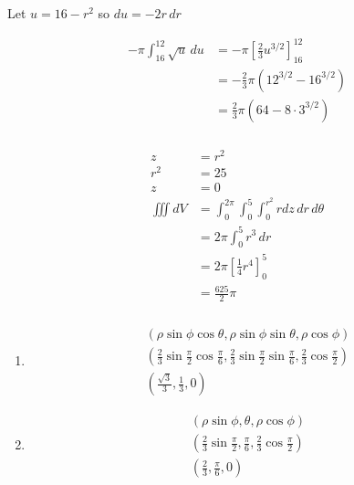 \documentclass{article}
\begin{document}
Let $u = 16 - r^2$ so $d u = -2 r \,dr$

\begin{align*}
  -\pi \int_{16}^{12} \sqrt{u} \,du & = -\pi \left[ \frac{2}{3} u^{3 / 2} \right]_{16}^{12} \\
                                    & = -\frac{2}{3} \pi (12^{3 / 2} - 16^{3 / 2})          \\
                                    & = \frac{2}{3} \pi (64 - 8 \cdot 3^{3 / 2})
\end{align*}

\setcounter{subsubsection}{52}
\subsubsection{}

\begin{align*}
  z         & = r^2                                                      \\
  r^2       & = 25                                                       \\
  z         & = 0                                                        \\
  \iiint dV & = \int_0^{2 \pi} \int_0^5 \int_0^{r^2} r dz \,dr \,d\theta \\
            & = 2 \pi \int_0^5 r^3 \,dr                                  \\
            & = 2 \pi \left[ \frac{1}{4} r^4 \right]_0^5                 \\
            & = \frac{625}{2} \pi
\end{align*}

\setcounter{subsubsection}{58}
\subsubsection{}

\begin{enumerate}
  \item

        \begin{align*}
          (\rho \sin \phi \cos \theta, \rho \sin \phi \sin \theta, \rho \cos \phi)                                                                            \\
          \left( \frac{2}{3} \sin \frac{\pi}{2} \cos \frac{\pi}{6}, \frac{2}{3} \sin \frac{\pi}{2} \sin \frac{\pi}{6}, \frac{2}{3} \cos \frac{\pi}{2} \right) \\
          \left( \frac{\sqrt{3}}{3}, \frac{1}{3}, 0 \right)
        \end{align*}

  \item

        \begin{align*}
          \left( \rho \sin \phi, \theta, \rho \cos \phi \right)                                        \\
          \left( \frac{2}{3} \sin \frac{\pi}{2}, \frac{\pi}{6}, \frac{2}{3} \cos \frac{\pi}{2} \right) \\
          \left( \frac{2}{3}, \frac{\pi}{6}, 0 \right)
        \end{align*}
\end{enumerate}
\end{document}
